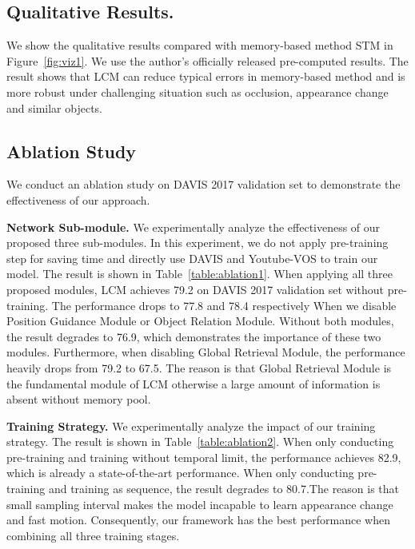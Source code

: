 \documentclass[final]{cvpr}
\begin{document}
\begin{figure*}[h]
\begin{center}
	\setlength{\fboxrule}{0pt}
\end{center}
\caption{Qualitative results of our proposed LCM. Our model is more robust under challenging situation such as occlusion, appearance change and similar objects.}
\label{fig:viz1}
\end{figure*}



\subsection{Qualitative Results. }
We show the qualitative results compared with memory-based method STM in Figure~\ref{fig:viz1}. We use the author’s officially released pre-computed results. 
The result shows that LCM can reduce typical errors in memory-based method and is more robust under challenging situation such as occlusion, appearance change and similar objects. 



\subsection{Ablation Study}
We conduct an ablation study on DAVIS 2017 validation set to demonstrate the effectiveness of our approach.

\textbf{Network Sub-module. }
We experimentally analyze the effectiveness of our proposed three sub-modules. In this experiment, we do not apply pre-training step for saving time and directly use DAVIS and Youtube-VOS to train our model. The result is shown in Table~\ref{table:ablation1}. When applying all three proposed modules, LCM achieves 79.2 on DAVIS 2017 validation set without pre-training. The performance drops to 77.8 and 78.4 respectively When we disable Position Guidance Module or Object Relation Module. Without both modules, the result degrades to 76.9, which demonstrates the importance of these two modules. Furthermore, when disabling Global Retrieval Module, the performance heavily drops from 79.2 to 67.5. The reason is that Global Retrieval Module is the fundamental module of LCM otherwise a large amount of information is absent without memory pool. 

\textbf{Training Strategy. }
We experimentally analyze the impact of our training strategy. The result is shown in Table~\ref{table:ablation2}. When only conducting pre-training and training without temporal limit, the performance achieves 82.9, which is already a state-of-the-art performance. When only conducting pre-training and training as sequence, the result degrades to 80.7.The reason is that small sampling interval makes the model incapable to learn appearance change and fast motion. Consequently, our framework has the best performance when combining all three training stages.
\end{document}
